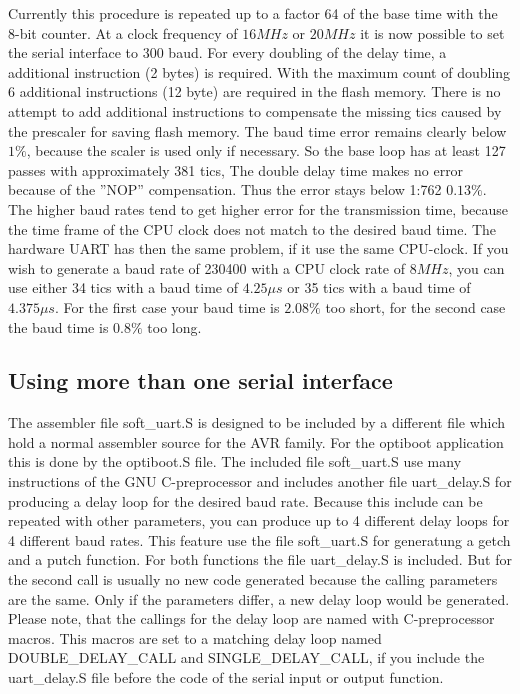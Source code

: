 Currently this procedure is repeated up to a factor 64 of the base time with the 8-bit counter.
At a clock frequency of \(16 MHz\) or \(20 MHz\) it is now possible to set the serial interface to 300 baud.
For every doubling of the delay time, a additional instruction (2 bytes) is required.
With the maximum count of doubling 6 additional instructions (12 byte) are required in the flash memory.
There is no attempt to add additional instructions to compensate the missing tics caused by
the prescaler for saving flash memory.
The baud time error remains clearly below \(1\%\), because the scaler is used only if necessary.
So the base loop has at least 127 passes with approximately 381 tics, The double delay time
makes no error because of the ''NOP'' compensation. Thus the error stays below 1:762 \(0.13\%\). 
The higher baud rates tend to get higher error for the transmission time, because
the time frame of the CPU clock does not match to the desired baud time.
The hardware UART has then the same problem, if it use the same CPU-clock.
If you wish to generate a baud rate of 230400 with a CPU clock rate of \(8 MHz\),
you can use either 34 tics with a baud time of \(4.25\mu s\) or
35 tics with a baud time of \(4.375\mu s\).
For the first case your baud time is \(2.08\%\) too short, for the
second case the baud time is \(0.8\%\) too long.

\subsection{Using more than one serial interface}

The assembler file soft\_uart.S is designed to be included by a different file which hold
a normal assembler source for the AVR family.
For the optiboot application this is done by the optiboot.S file.
The included file soft\_uart.S use many instructions of the
GNU C-preprocessor and includes another file uart\_delay.S for producing a delay loop
for the desired baud rate. Because this include can be repeated with other parameters,
you can produce up to 4 different delay loops for 4 different baud rates.
This feature use the file soft\_uart.S for generatung a getch and a putch function.
For both functions the file uart\_delay.S is included. But for the second call is
usually no new code generated because the calling parameters are the same.
Only if the parameters differ, a new delay loop would be generated.
Please note, that the callings for the delay loop are named with C-preprocessor macros.
This macros are set to a matching delay loop named DOUBLE\_DELAY\_CALL and SINGLE\_DELAY\_CALL,
if you include the uart\_delay.S file before the code of the serial input or output function.


